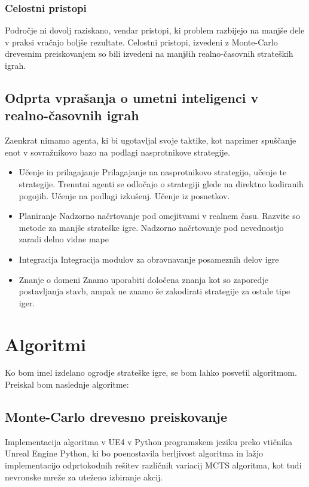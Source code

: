 \documentclass[a4paper, 12pt]{book}
\begin{document}
\subsection{Celostni pristopi}
Področje ni dovolj raziskano, vendar pristopi, ki problem razbijejo na manjše dele v praksi vračajo boljše rezultate.
Celostni pristopi, izvedeni z Monte-Carlo drevesnim preiskovanjem so bili izvedeni na manjših realno-časovnih strateških igrah.

\section{Odprta vprašanja o umetni inteligenci v realno-časovnih igrah}
Zaenkrat nimamo agenta, ki bi ugotavljal svoje taktike, kot naprimer spuščanje enot v sovražnikovo bazo na podlagi nasprotnikove strategije.
\begin{itemize}
\item Učenje in prilagajanje
Prilagajanje na nasprotnikovo strategijo, učenje te strategije.
Trenutni agenti se odločajo o strategiji glede na direktno kodiranih pogojih.
Učenje na podlagi izkušenj.
Učenje iz posnetkov.
\item Planiranje
Nadzorno načrtovanje pod omejitvami v realnem času. Razvite so metode za manjše strateške igre.
Nadzorno načrtovanje pod nevednostjo zaradi delno vidne mape
\item Integracija
Integracija modulov za obravnavanje posameznih delov igre
\item Znanje o domeni
Znamo uporabiti določena znanja kot so zaporedje postavljanja stavb, ampak ne znamo še zakodirati strategije za ostale tipe iger.
\end{itemize}


\chapter{Algoritmi}
Ko bom imel izdelano ogrodje strateške igre, se bom lahko posvetil algoritmom.
Preiskal bom naslednje algoritme:
\section{Monte-Carlo drevesno preiskovanje}
Implementacija algoritma v UE4 v Python programskem jeziku preko vtičnika Unreal Engine Python, ki bo poenostavila berljivost algoritma in lažjo implementacijo odprtokodnih rešitev različnih variacij MCTS algoritma, kot tudi nevronske mreže za uteženo izbiranje akcij.
\end{document}
